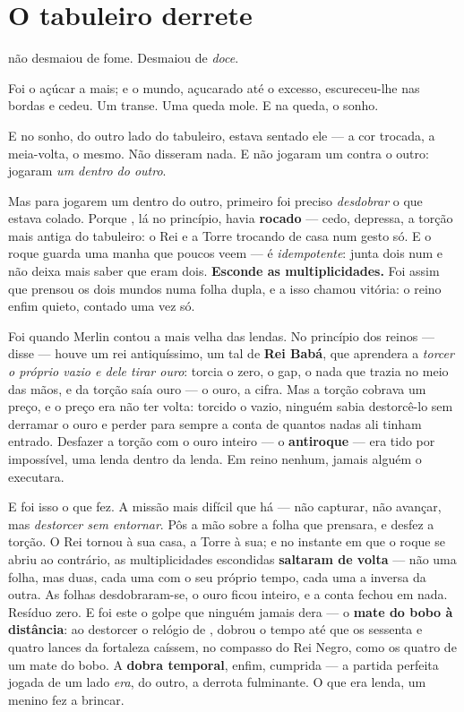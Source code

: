 \documentclass[livro.tex]{subfiles}
\begin{document}
\chapter{O tabuleiro derrete}

\Ven não desmaiou de fome. Desmaiou de \emph{doce}.

Foi o açúcar a mais; e o mundo, açucarado até o excesso, escureceu-lhe nas bordas e
cedeu. Um transe. Uma queda mole. E na queda, o sonho.

\medskip

E no sonho, do outro lado do tabuleiro, estava sentado ele --- a cor trocada, a
meia-volta, o mesmo. Não disseram nada. E não jogaram um contra o outro: jogaram
\emph{um dentro do outro}.

\medskip

Mas para jogarem um dentro do outro, primeiro foi preciso \emph{desdobrar} o que
estava colado. Porque \Ven , lá no princípio, havia \textbf{rocado} --- cedo, depressa,
a torção mais antiga do tabuleiro: o Rei e a Torre trocando de casa num gesto só. E o
roque guarda uma manha que poucos veem --- é \emph{idempotente}: junta dois num e não
deixa mais saber que eram dois. \textbf{Esconde as multiplicidades.} Foi assim que
\Ven prensou os dois mundos numa folha dupla, e a isso chamou vitória: o reino enfim
quieto, contado uma vez só.

\medskip

Foi quando Merlin contou a mais velha das lendas. No princípio dos reinos --- disse ---
houve um rei antiquíssimo, um tal de \textbf{Rei Babá}, que aprendera a \emph{torcer o
próprio vazio e dele tirar ouro}: torcia o zero, o gap, o nada que trazia no meio das
mãos, e da torção saía ouro --- o ouro, a cifra. Mas a torção cobrava um preço, e o
preço era não ter volta: torcido o vazio, ninguém sabia destorcê-lo sem derramar o
ouro e perder para sempre a conta de quantos nadas ali tinham entrado. Desfazer a
torção com o ouro inteiro --- o \textbf{antiroque} --- era tido por impossível, uma
lenda dentro da lenda. Em reino nenhum, jamais alguém o executara.

\medskip

E foi isso o que \Ben fez. A missão mais difícil que há --- não capturar, não avançar,
mas \emph{destorcer sem entornar}. Pôs a mão sobre a folha que \Ven prensara, e
desfez a torção. O Rei tornou à sua casa, a Torre à sua; e no instante em que o roque
se abriu ao contrário, as multiplicidades escondidas \textbf{saltaram de volta} --- não
uma folha, mas duas, cada uma com o seu próprio tempo, cada uma a inversa da outra. As
folhas desdobraram-se, o ouro ficou inteiro, e a conta fechou em nada. Resíduo zero. E foi este o golpe que ninguém jamais dera --- o
\textbf{mate do bobo à distância}: ao destorcer o relógio de \Ven , \Ben dobrou o tempo
até que os sessenta e quatro lances da fortaleza caíssem, no compasso do Rei Negro,
como os quatro de um mate do bobo. A \textbf{dobra temporal}, enfim, cumprida --- a partida
perfeita jogada de um lado \emph{era}, do outro, a derrota fulminante. O que era lenda,
um menino fez a brincar.
\end{document}
